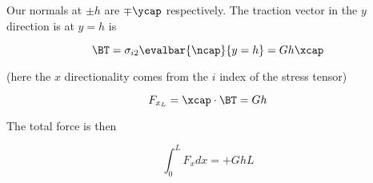 Our normals at $\pm h$ are $\mp \ycap$ respectively.  The traction vector in the $y$ direction is at $y = h$ is

\begin{equation}\label{eqn:continuumL11:770}
\BT = \sigma_{i 2} \evalbar{\ncap}{y = h} = G h \xcap
\end{equation}

(here the $x$ directionality comes from the $i$ index of the stress tensor)

\begin{equation}\label{eqn:continuumL11:790}
F_{x_L} = \xcap \cdot \BT = G h
\end{equation}

The total force is then

\begin{equation}\label{eqn:continuumL11:810}
\int_0^L F_x dx = + G h L
\end{equation}

\EndArticle
